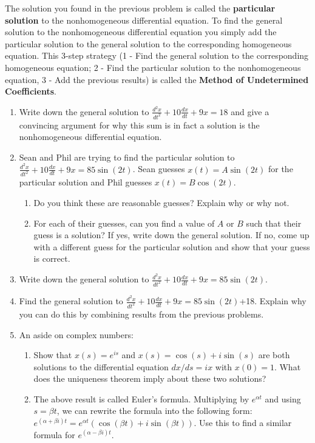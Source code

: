 The solution you found in the previous problem is called the \textbf{particular solution} to the nonhomogeneous differential equation. To find the general solution to the nonhomogeneous differential equation you simply add the particular solution to the general solution to the corresponding homogeneous equation. This 3-step strategy (1 - Find the general solution to the corresponding homogeneous equation; 2 - Find the particular solution to the nonhomogeneous equation, 3 - Add the previous results) is called the \textbf{Method of Undetermined Coefficients}.

\begin{enumerate}[resume]
\item Write down the general solution to $\displaystyle\frac{d^2x}{dt^2}+10\frac{dx}{dt}+9x=18$ and give a convincing argument for why this sum is in fact a solution is the nonhomogeneous differential equation. \label{07problem9} \vfill

\item Sean and Phil are trying to find the particular solution to $\displaystyle\frac{d^2x}{dt^2}+10\frac{dx}{dt}+9x=85\sin(2t)$. Sean guesses $x(t)=A\sin(2t)$ for the particular solution and Phil guesses $x(t)=B\cos(2t)$. \label{07problem10}

\begin{enumerate}
\item Do you think these are reasonable guesses? Explain why or why not. \label{07problem10parta} \vfill
\item For each of their guesses, can you find a value of $A$ or $B$ such that their guess is a solution? If yes, write down the general solution. If no, come up with a different guess for the particular solution and show that your guess is correct. \label{07problem10partb} \vfill
\end{enumerate}

\clearpage

\item Write down the general solution to $\displaystyle\frac{d^2x}{dt^2}+10\frac{dx}{dt}+9x=85\sin(2t)$. \label{07problem11} \vfill

\item Find the general solution to $\displaystyle\frac{d^2x}{dt^2}+10\frac{dx}{dt}+9x=85\sin(2t)$+18. Explain why you can do this by combining results from the previous problems. \label{07problem12} \vfill

\item An aside on complex numbers: \label{07problem07}
\begin{enumerate}
\item Show that $x(s) = e^{is}$ and $x(s) = \cos(s) + i\sin(s)$ are both solutions to the differential equation $dx/ds = ix$ with $x(0) = 1$.  What does the uniqueness theorem imply about these two solutions? \label{07problem07parta} \vfill
\item The above result is called Euler's formula. Multiplying by $e^{\alpha t}$ and using $s =\beta t$, we can rewrite the formula into the following form: $e^{(\alpha + \beta i )t} =  e^{\alpha t} (\cos(\beta t) + i\sin(\beta t))$. Use this to find a similar formula for $e^{(\alpha - \beta i) t}$. \label{07problem07partb} \vfill


\end{enumerate}
\end{enumerate}
